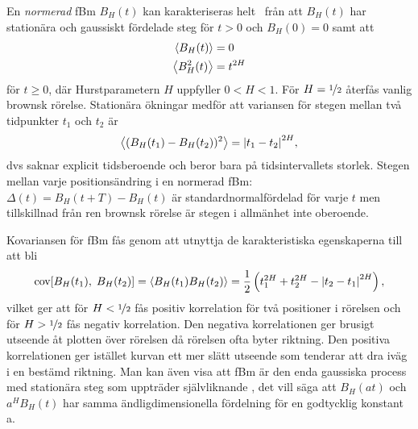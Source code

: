 En \emph{normerad} fBm $B_H(t)$ kan karakteriseras helt~\cite{Dieker_fBm} från att $B_H(t)$ har stationära och gaussiskt fördelade steg för $t>0$ och $B_H(0)=0$ samt att 
\begin{equation}
\begin{aligned}
    \ev{B_H(t)}&=0 \\
    \ev{B^2_H(t)}&=t^{2H}
\end{aligned}
\end{equation}
för $t\geq 0$, där Hurstparametern $H$ uppfyller $0< H <1$. För $H=\nicefrac{1}{2}$ återfås vanlig brownsk rörelse. Stationära ökningar medför att variansen för stegen mellan två tidpunkter $t_1$ och $t_2$ är
\begin{equation} \label{eq:fBm_MSD}
    \ev{(B_H(t_1)-B_H(t_2))^2} = \abs{t_1-t_2}^{2H},
\end{equation}
dvs saknar explicit tidsberoende och beror bara på tidsintervallets storlek. Stegen mellan varje positionsändring i en normerad fBm:  $\Delta(t)=B_H(t+T)-B_H(t)$ är standardnormalfördelad för varje $t$ men tillskillnad från ren brownsk rörelse är stegen i allmänhet inte oberoende. 


Kovariansen för fBm fås genom att utnyttja de karakteristiska egenskaperna till att bli
\begin{equation}
\COV{B_H(t_1)}{B_H(t_2)}=\ev{B_H(t_1)B_H(t_2)}
= \frac{1}{2} \left(t_1^{2H}+t_2^{2H}-\abs{t_2-t_1}^{2H}\right),
\end{equation}
vilket ger att för $H<\nicefrac{1}{2}$ fås positiv korrelation för två positioner i rörelsen och för  $H>\nicefrac{1}{2}$ fås negativ korrelation. Den negativa korrelationen ger brusigt utseende åt plotten över rörelsen då rörelsen ofta byter riktning. Den positiva korrelationen ger istället kurvan ett mer slätt utseende som tenderar att dra iväg i en bestämd riktning. Man kan även visa att fBm är den enda gaussiska process med stationära steg som uppträder självliknande \cite{Dieker_fBm}, det vill säga att $B_H(at)$ och $a^H B_H(t)$ har samma ändligdimensionella fördelning för en godtycklig konstant a.


